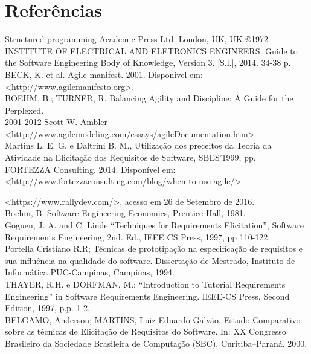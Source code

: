
\chapter[Referências]{Referências}

Structured programming  Academic Press Ltd. London, UK, UK ©1972\\

INSTITUTE OF ELECTRICAL AND ELETRONICS ENGINEERS. Guide to the Software Engineering Body of Knowledge, Version 3. [S.l.], 2014. 34-38 p.\\

BECK, K. et al. Agile manifest. 2001. Disponível em: \\<http://www.agilemanifesto.org>.\\

BOEHM, B.; TURNER, R. Balancing Agility and Discipline: A Guide for the Perplexed.\\

2001-2012 Scott W. Ambler \\<http://www.agilemodeling.com/essays/agileDocumentation.htm>\\

Martins L. E. G. e Daltrini B. M., Utilização dos preceitos da Teoria da Atividade na Elicitação dos Requisitos de Software, SBES’1999, pp.\\

FORTEZZA Consulting. 2014. Disponível em: <http://www.fortezzaconsulting.com/blog/when-to-use-agile/>

<https://www.rallydev.com/>, acesso em 26 de Setembro de 2016.\\
Boehm, B. Software Engineering Economics, Prentice-Hall, 1981.\\

Goguen, J. A. and C. Linde “Techniques for Requirements Elicitation”, Software Requirements Engineering, 2nd. Ed., IEEE CS Press, 1997, pp 110-122.\\

Portella Cristiano R.R; Técnicas de prototipação na especificação de requisitos e sua influência na qualidade do software. Dissertação de Mestrado, Instituto de Informática PUC-Campinas, Campinas, 1994.\\

THAYER, R.H. e DORFMAN, M.; “Introduction to Tutorial Requirements Engineering” in Software Requirements Engineering. IEEE-CS Press, Second Edition, 1997, p.p. 1-2.\\

BELGAMO, Anderson; MARTINS, Luiz Eduardo Galvão. Estudo Comparativo sobre as técnicas de Elicitação de Requisitos do Software. In: XX Congresso Brasileiro da Sociedade Brasileira de Computação (SBC), Curitiba–Paraná. 2000.\\

